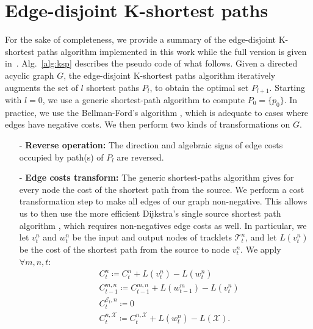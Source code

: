 \glsresetall

\chapter{Edge-disjoint K-shortest paths}
\label{sec:ksp}

For the sake of completeness, we provide a summary of the edge-disjoint K-shortest paths algorithm implemented in this work while the full version is given in~\cite{suurballe74}.
Alg.~\ref{alg:ksp} describes the pseudo code of what follows.
Given a directed acyclic graph $G$, the edge-disjoint K-shortest paths algorithm iteratively augments the set of $l$ shortest paths $P_{l}$, to obtain the optimal set $P_{l+1}$. Starting with $l=0$, we use a generic shortest-path algorithm to compute $P_0=\{p_0\}$.
In practice, we use the Bellman-Ford's algorithm \cite{bellman58}, which is adequate to cases where edges have negative costs. We then perform two kinds of transformations on $G$.

\begin{itemize}
\item[-]  {\bf{Reverse operation:}} The direction and algebraic signs of edge costs occupied by path(s) of $P_{l}$ are reversed.
\item[-] {\bf{Edge costs transform:}}
The generic shortest-paths algorithm gives for every node the cost of the shortest path from the source. We perform a cost transformation step to make all edges of our graph non-negative. This allows us to then use the more efficient Dijkstra's single source shortest path algorithm \cite{dijkstra59}, which requires non-negatives edge costs as well.
In particular, we let $v_t^n$ and $w_t^n$ be the input and output nodes of tracklets $\mathcal{T}_t^n$, and let $L(v_t^n)$ be the cost of the shortest path from the source to node $v_t^n$. We apply $\forall m,n,t$:
\begin{subequations}
\label{eq:cost_transform}
\begin{align}
&C_t^{n} \coloneqq C_t^n + L(v_t^n) - L(w_t^n)\label{eq:cost_transform_tracklet}\\
&C_{t-1}^{m,n} \coloneqq C_{t-1}^{m,n} + L(w_{t-1}^m) - L(v_{t}^n)\label{eq:cost_transform_transition}\\
&C_t^{\mathcal{E}_t,n} \coloneqq 0 \label{eq:cost_transform_entrance}\\
&C_t^{n,\mathcal{X}} \coloneqq C_t^{n,\mathcal{X}} + L(w_t^n) - L(\mathcal{X}). \label{eq:cost_transform_sink}
\end{align}
\end{subequations}
\end{itemize}


